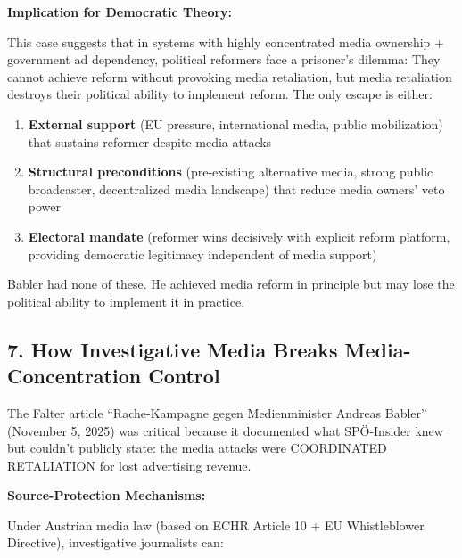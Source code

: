 \textbf{Implication for Democratic Theory:}

This case suggests that in systems with highly concentrated media ownership + government ad
dependency, political reformers face a prisoner's dilemma: They cannot achieve reform without
provoking media retaliation, but media retaliation destroys their political ability to implement
reform. The only escape is either:

\begin{enumerate}
\item \textbf{External support} (EU pressure, international media, public mobilization) that sustains
  reformer despite media attacks
\item \textbf{Structural preconditions} (pre-existing alternative media, strong public broadcaster,
  decentralized media landscape) that reduce media owners' veto power
\item \textbf{Electoral mandate} (reformer wins decisively with explicit reform platform, providing
  democratic legitimacy independent of media support)
\end{enumerate}

Babler had none of these. He achieved media reform in principle but may lose the political ability
to implement it in practice.

\label{sec:dx-whistleblowing}

\subsection*{7. How Investigative Media Breaks Media-Concentration Control}

The Falter article ``Rache-Kampagne gegen Medienminister Andreas Babler''
(November 5, 2025) was critical because it documented what SPÖ-Insider knew but
couldn't publicly state: the media attacks were COORDINATED RETALIATION for lost
advertising revenue.

\textbf{Source-Protection Mechanisms:}

Under Austrian media law (based on ECHR Article 10 + EU Whistleblower Directive),
investigative journalists can:

